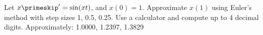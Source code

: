 {Let $x\primeskip' = \sin(xt)$, and $x(0)=1$.
Approximate $x(1)$ using Euler's method with step sizes 1, 0.5, 0.25.
Use a calculator and compute up to 4 decimal digits.}
{Approximately: 1.0000, 1.2397, 1.3829}
